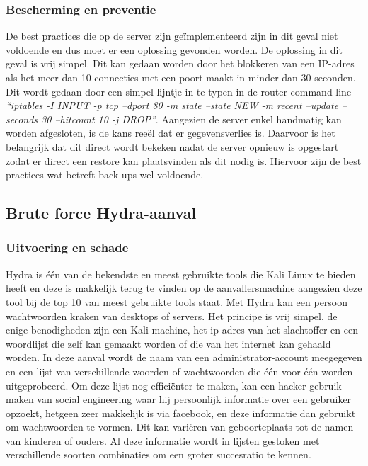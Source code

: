 \documentclass[pdftex,a4paper,12pt]{report}
\begin{document}
\subsubsection{Bescherming en preventie}
De best practices die op de server zijn geïmplementeerd zijn in dit geval niet voldoende en dus moet er een oplossing gevonden worden. De oplossing in dit geval is vrij simpel. Dit kan gedaan worden door het blokkeren van een IP-adres als het meer dan 10 connecties met een poort maakt in minder dan 30 seconden. Dit wordt gedaan door een simpel lijntje in te typen in de router command line \textit{"`iptables -I INPUT -p tcp --dport 80 -m state --state NEW -m recent --update --seconds 30 --hitcount 10 -j DROP"'}. Aangezien de server enkel handmatig kan worden afgesloten, is de kans reeël dat er gegevensverlies is. Daarvoor is het belangrijk dat dit direct wordt bekeken nadat de server opnieuw is opgestart zodat er direct een restore kan plaatsvinden als dit nodig is. Hiervoor zijn de best practices wat betreft back-ups wel voldoende. 

\subsection{Brute force Hydra-aanval}
\subsubsection{Uitvoering en schade}
Hydra is één van de bekendste en meest gebruikte tools die Kali Linux te bieden heeft en deze is makkelijk terug te vinden op de aanvallersmachine aangezien deze tool bij de top 10 van meest gebruikte tools staat. Met Hydra kan een persoon wachtwoorden kraken van desktops of servers. Het principe is vrij simpel, de enige benodigheden zijn een Kali-machine, het ip-adres van het slachtoffer en een woordlijst die zelf kan gemaakt worden of die van het internet kan gehaald worden. In deze aanval wordt de naam van een administrator-account meegegeven en een lijst van verschillende woorden of wachtwoorden die één voor één worden uitgeprobeerd. Om deze lijst nog efficiënter te maken, kan een hacker gebruik maken van social engineering waar hij persoonlijk informatie over een gebruiker opzoekt, hetgeen zeer makkelijk is via facebook, en deze informatie dan gebruikt om wachtwoorden te vormen. Dit kan variëren van geboorteplaats tot de namen van kinderen of ouders. Al deze informatie wordt in lijsten gestoken met verschillende soorten combinaties om een groter succesratio te kennen. \citep{Wilde2013} \newline 
\end{document}
